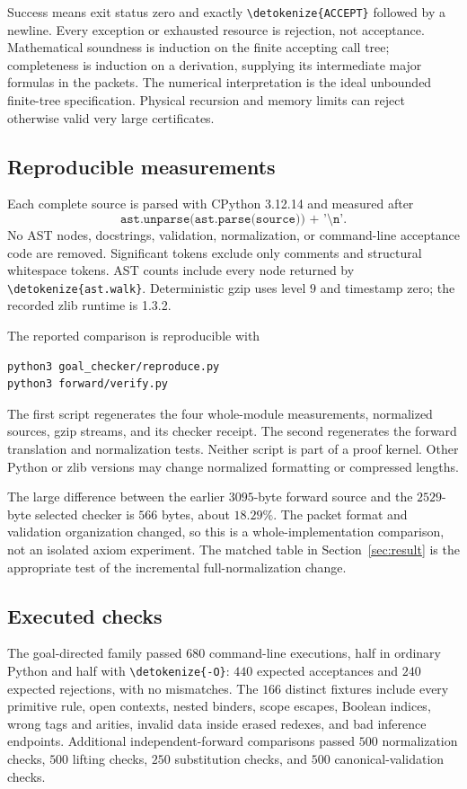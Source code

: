 \documentclass[11pt,letterpaper]{article}
\theoremstyle{definition}
\theoremstyle{remark}
\newcommand{\file}[1]{\expandafter\nolinkurl\expandafter{\detokenize{#1}}}
\begin{document}
Success means exit status zero and exactly \file{ACCEPT} followed
by a newline. Every exception or exhausted resource is rejection,
not acceptance. Mathematical soundness is induction on the finite
accepting call tree; completeness is induction on a derivation,
supplying its intermediate major formulas in the packets.
The numerical interpretation is the ideal unbounded finite-tree
specification. Physical recursion and memory limits can reject
otherwise valid very large certificates.

\subsection{Reproducible measurements}

Each complete source is parsed with CPython 3.12.14 and measured after
\[
 \texttt{ast.unparse(ast.parse(source)) + '\textbackslash n'}.
\]
No AST nodes, docstrings, validation, normalization, or command-line
acceptance code are removed. Significant tokens exclude only comments
and structural whitespace tokens. AST counts include every node
returned by \file{ast.walk}. Deterministic gzip uses level $9$ and
timestamp zero; the recorded zlib runtime is 1.3.2.

The reported comparison is reproducible with
\begin{lstlisting}
python3 goal_checker/reproduce.py
python3 forward/verify.py
\end{lstlisting}
The first script regenerates the four whole-module measurements,
normalized sources, gzip streams, and its checker receipt.
The second regenerates the forward translation and normalization tests.
Neither script is part of a proof kernel. Other Python or zlib versions
may change normalized formatting or compressed lengths.

The large difference between the earlier $3095$-byte forward source and
the $2529$-byte selected checker is $566$ bytes, about $18.29\%$.
The packet format and validation organization changed, so this is a
whole-implementation comparison, not an isolated axiom experiment.
The matched table in Section~\ref{sec:result} is the appropriate test
of the incremental full-normalization change.

\subsection{Executed checks}

The goal-directed family passed $680$ command-line executions,
half in ordinary Python and half with \file{-O}: $440$ expected
acceptances and $240$ expected rejections, with no mismatches.
The $166$ distinct fixtures include every primitive rule, open
contexts, nested binders, scope escapes, Boolean indices, wrong
tags and arities, invalid data inside erased redexes, and bad
inference endpoints. Additional independent-forward comparisons
passed $500$ normalization checks, $500$ lifting checks, $250$
substitution checks, and $500$ canonical-validation checks.
\end{document}
